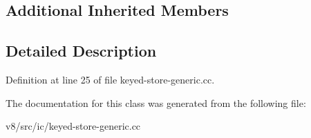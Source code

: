 \subsection*{Additional Inherited Members}


\subsection{Detailed Description}


Definition at line 25 of file keyed-\/store-\/generic.\+cc.



The documentation for this class was generated from the following file\+:\begin{DoxyCompactItemize}
\item 
v8/src/ic/keyed-\/store-\/generic.\+cc\end{DoxyCompactItemize}
